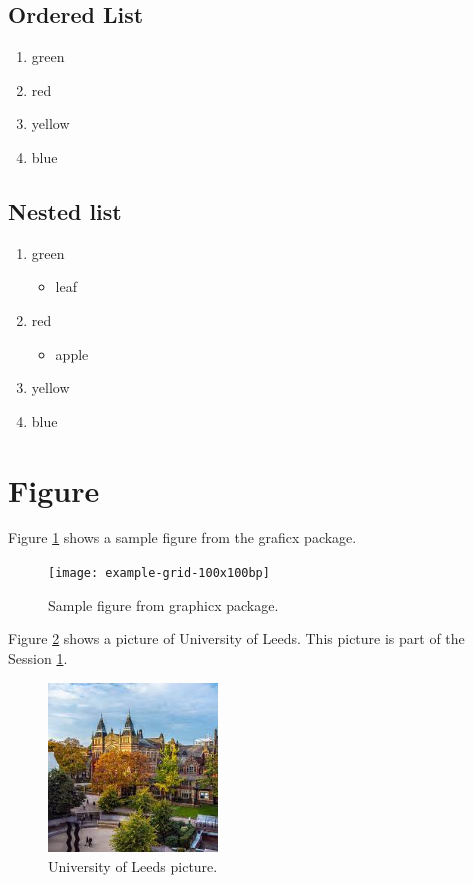\documentclass{article}
\begin{document}
\blindtext[1]

\subsection{Ordered List}
\begin{enumerate}
    \item green
    \item red
    \item yellow
    \item blue
\end{enumerate}

\blindtext[1]

\subsection{Nested list}
\begin{enumerate}
    \item green
    \begin{itemize}
        \item leaf
    \end{itemize}
    \item red
    \begin{itemize}
        \item apple
    \end{itemize}
    \item yellow
    \item blue
\end{enumerate}


\section{Figure}\label{sec:fig}
Figure \ref{fig:sample-fig} shows a sample figure from the graficx package.
\blindtext[1]
\begin{figure}[h]
    \centering
    \texttt{[image: example-grid-100x100bp]}
    \caption{Sample figure from graphicx package.}
    \label{fig:sample-fig}  %
\end{figure}

Figure \ref{fig:uni-pic} shows a picture of University of Leeds. This picture is part of the Session \ref{sec:fig}.
\blindtext[1]
\begin{figure}[h]  %
    \centering
    \includegraphics[width=0.4\textwidth]{uni.jpg}
    \caption{University of Leeds picture.}
    \label{fig:uni-pic}  %
\end{figure}
\end{document}
